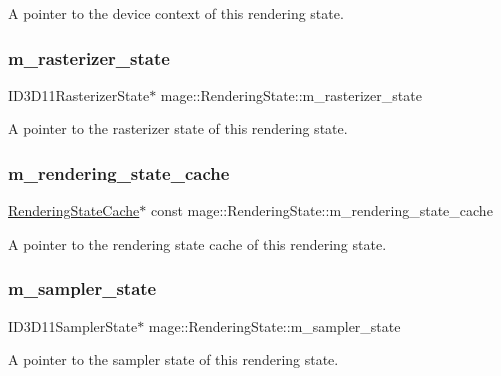A pointer to the device context of this rendering state. \hypertarget{structmage_1_1_rendering_state_a63b8c00bd0e2e1c56bd2a42f269733a8}{}\label{structmage_1_1_rendering_state_a63b8c00bd0e2e1c56bd2a42f269733a8} 
\subsubsection{\texorpdfstring{m\+\_\+rasterizer\+\_\+state}{m\_rasterizer\_state}}
{\footnotesize\ttfamily I\+D3\+D11\+Rasterizer\+State$\ast$ mage\+::\+Rendering\+State\+::m\+\_\+rasterizer\+\_\+state\hspace{0.3cm}{\ttfamily [private]}}

A pointer to the rasterizer state of this rendering state. \hypertarget{structmage_1_1_rendering_state_a8d422a14392f89eec1ece2d917511168}{}\label{structmage_1_1_rendering_state_a8d422a14392f89eec1ece2d917511168} 
\subsubsection{\texorpdfstring{m\+\_\+rendering\+\_\+state\+\_\+cache}{m\_rendering\_state\_cache}}
{\footnotesize\ttfamily \hyperlink{structmage_1_1_rendering_state_cache}{Rendering\+State\+Cache}$\ast$ const mage\+::\+Rendering\+State\+::m\+\_\+rendering\+\_\+state\+\_\+cache\hspace{0.3cm}{\ttfamily [private]}}

A pointer to the rendering state cache of this rendering state. \hypertarget{structmage_1_1_rendering_state_a88c58f587b9670d662aef5a3a52fa38d}{}\label{structmage_1_1_rendering_state_a88c58f587b9670d662aef5a3a52fa38d} 
\subsubsection{\texorpdfstring{m\+\_\+sampler\+\_\+state}{m\_sampler\_state}}
{\footnotesize\ttfamily I\+D3\+D11\+Sampler\+State$\ast$ mage\+::\+Rendering\+State\+::m\+\_\+sampler\+\_\+state\hspace{0.3cm}{\ttfamily [private]}}

A pointer to the sampler state of this rendering state. 
